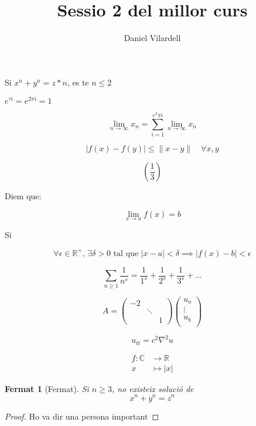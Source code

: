 \documentclass[12pt, a4papre]{article}
\author{Daniel Vilardell}
\title{Sessio 2 del millor curs}
\date{}
\begin{document}
\maketitle

Si $x^n + y^n = z*n$, es te $n \leq 2$
\newline
\begin{center}
$e^{\tau i} = e^{2\pi i} = 1$
\end{center}

\[
	\lim_{n \to \infty} x_n=
	\sum_{i=1}^{e^2 \pi i} 
	\lim_{n \to \infty} x_n
\]

\[
	|f(x) - f(y)| \leq
	\|x-y\| \quad \forall x,y
\]

\[\left(\frac{1}{3}\right)\]


Diem que:

\[
\lim_{x \to a} f(x) = b
\]

Si 

\[
	\forall \epsilon \in \mathbb{R}^+,\,
	\exists \delta > 0 \text{ tal que } |x-a| < \delta 
	\implies |f(x)-b| <  \epsilon
\]

\[
 	\sum_{n \ge 1} \frac{1}{n^s} = 
	\frac{1}{1^s} + \frac{1}{2^s} + \frac{1}{3^s} + \dots
\]

\[
	A = 
	\begin{pmatrix}
		-2 &		& \\
		    & \ddots	& \\
		    & 		& 1 
	\end{pmatrix}
	\begin{pmatrix}
		u_a \\
		\vdots \\
		u_b \\
	\end{pmatrix}
\]

\begin{equation}
	u_{tt} = c^2 \nabla^2u
	\label{eq:calor}
\end{equation}


\begin{align*}
f \colon \mathbb{C} & \to \mathbb{R}\\
x & \mapsto |x|
\end{align*}

\newtheorem{teo}{Fermat}[section]
	\begin{teo}[Fermat]
		Si $n \geq 3$,
		no existeix solució de 
		\[
			x^n + y^n = z^n
		\]
	\end{teo}
	\begin{proof}
		Ho va dir una persona important
	\end{proof}
\end{document}
